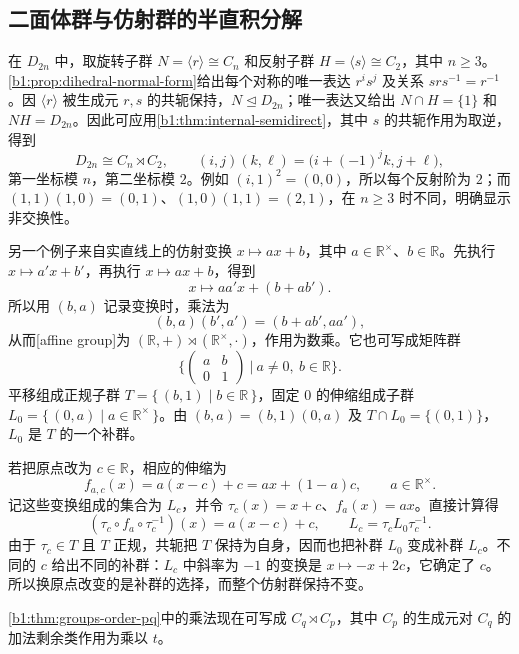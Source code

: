 \subsection{二面体群与仿射群的半直积分解}
\label{b1:subsec:0602:03}

在 \(D_{2n}\) 中，取旋转子群 \(N=\langle r\rangle\cong C_n\) 和反射子群 \(H=\langle s\rangle\cong C_2\)，其中 \(n\geq3\)。\cref{b1:prop:dihedral-normal-form}给出每个对称的唯一表达 \(r^is^j\) 及关系 \(srs^{-1}=r^{-1}\)。因 \(\langle r\rangle\) 被生成元 \(r,s\) 的共轭保持，\(N\trianglelefteq D_{2n}\)；唯一表达又给出 \(N\cap H=\{1\}\) 和 \(NH=D_{2n}\)。因此可应用\cref{b1:thm:internal-semidirect}，其中 \(s\) 的共轭作用为取逆，得到
\[
	D_{2n}\cong C_n\rtimes C_2,\qquad (i,j)(k,\ell)=\bigl(i+(-1)^jk,j+\ell\bigr),
\]
第一坐标模 \(n\)，第二坐标模 \(2\)。例如 \((i,1)^2=(0,0)\)，所以每个反射阶为 \(2\)；而 \((1,1)(1,0)=(0,1)\)、\((1,0)(1,1)=(2,1)\)，在 \(n\geq3\) 时不同，明确显示非交换性。

\ProseParagraphBreak
另一个例子来自实直线上的仿射变换 \(x\mapsto ax+b\)，其中 \(a\in\mathbb R^\times\)、\(b\in\mathbb R\)。先执行 \(x\mapsto a'x+b'\)，再执行 \(x\mapsto ax+b\)，得到
\[
	x\longmapsto aa'x+(b+ab').
\]
所以用 \((b,a)\) 记录变换时，乘法为
\[
	(b,a)(b',a')=(b+ab',aa'),
\]
从而[affine group]为 \((\mathbb R,+)\rtimes(\mathbb R^\times,\cdot)\)，作用为数乘。它也可写成矩阵群
\[
	\Biggl\{\begin{pmatrix}a&b\\0&1\end{pmatrix}
	\ \Bigg|\ a\neq0,\ b\in\mathbb R\Biggr\}.
\]
平移组成正规子群 \(T=\{\,(b,1)\mid b\in\mathbb R\,\}\)，固定 \(0\) 的伸缩组成子群 \(L_0=\{\,(0,a)\mid a\in\mathbb R^\times\,\}\)。由 \((b,a)=(b,1)(0,a)\) 及 \(T\cap L_0=\{(0,1)\}\)，\(L_0\) 是 \(T\) 的一个补群。

\ProseParagraphBreak
若把原点改为 \(c\in\mathbb R\)，相应的伸缩为
\[
	f_{a,c}(x)=a(x-c)+c=ax+(1-a)c, \qquad a\in\mathbb R^\times.
\]
记这些变换组成的集合为 \(L_c\)，并令 \(\tau_c(x)=x+c\)、\(f_a(x)=ax\)。直接计算得
\[
	(\tau_c\circ f_a\circ\tau_c^{-1})(x)=a(x-c)+c, \qquad L_c=\tau_c L_0\tau_c^{-1}.
\]
由于 \(\tau_c\in T\) 且 \(T\) 正规，共轭把 \(T\) 保持为自身，因而也把补群 \(L_0\) 变成补群 \(L_c\)。不同的 \(c\) 给出不同的补群：\(L_c\) 中斜率为 \(-1\) 的变换是 \(x\mapsto-x+2c\)，它确定了 \(c\)。所以换原点改变的是补群的选择，而整个仿射群保持不变。

\ProseParagraphBreak
\cref{b1:thm:groups-order-pq}中的乘法现在可写成 \(C_q\rtimes C_p\)，其中 \(C_p\) 的生成元对 \(C_q\) 的加法剩余类作用为乘以 \(t\)。

